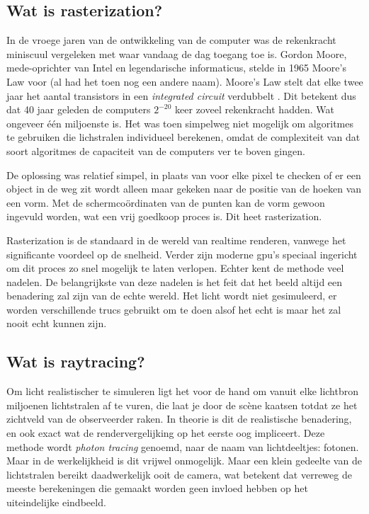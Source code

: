 \documentclass[12pt, a4paper]{article}
\begin{document}
\subsection{Wat is rasterization?}
In de vroege jaren van de ontwikkeling van de computer was de rekenkracht miniscuul vergeleken met waar vandaag de dag toegang toe is. Gordon Moore, mede-oprichter van Intel en legendarische informaticus, stelde in 1965 Moore's Law voor (al had het toen nog een andere naam). Moore's Law stelt dat elke twee jaar het aantal transistors in een \emph{integrated circuit} verdubbelt \cite{CrammingComponents}. Dit betekent dus dat 40 jaar geleden de computers \(2^{-20}\) keer zoveel rekenkracht hadden. Wat ongeveer één miljoenste is. Het was toen simpelweg niet mogelijk om algoritmes te gebruiken die lichstralen individueel berekenen, omdat de complexiteit van dat soort algoritmes de capaciteit van de computers ver te boven gingen.

De oplossing was relatief simpel, in plaats van voor elke pixel te checken of er een object in de weg zit wordt alleen maar gekeken naar de positie van de hoeken van een vorm. Met de schermcoördinaten van de punten kan de vorm gewoon ingevuld worden, wat een vrij goedkoop proces is. Dit heet rasterization.

Rasterization is de standaard in de wereld van realtime renderen, vanwege het significante voordeel op de snelheid. Verder zijn moderne gpu's speciaal ingericht om dit proces zo snel mogelijk te laten verlopen. \cite{10.1145/2018323.2018337}
 Echter kent de methode veel nadelen. De belangrijkste van deze nadelen is het feit dat het beeld altijd een benadering zal zijn van de echte wereld. Het licht wordt niet gesimuleerd, er worden verschillende trucs gebruikt om te doen alsof het echt is maar het zal nooit echt kunnen zijn. 
\subsection{Wat is raytracing?}

Om licht realistischer te simuleren ligt het voor de hand om vanuit elke lichtbron miljoenen lichtstralen af te vuren, die laat je door de scène kaatsen totdat ze het zichtveld van de observeerder raken. In theorie is dit de realistische benadering, en ook exact wat de rendervergelijking op het eerste oog impliceert. Deze methode wordt \emph{photon tracing} genoemd, naar de naam van lichtdeeltjes: fotonen. Maar in de werkelijkheid is dit vrijwel onmogelijk. Maar een klein gedeelte van de lichtstralen bereikt daadwerkelijk ooit de camera, wat betekent dat verreweg de meeste berekeningen die gemaakt worden geen invloed hebben op het uiteindelijke eindbeeld. 
\end{document}
